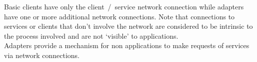 Basic clients have only the client~/~service \yarp{} network connection while adapters
have one or more additional \yarp{} network connections.
Note that connections to services or clients that don't involve the \yarp{} network are
considered to be intrinsic to the process involved and are not `visible' to \mplusm{}
applications.\\

Adapters provide a mechanism for non\longDash\mplusm{} applications to make requests of
\mplusm{} services via \yarp{} network connections.
\primaryEnd{}
